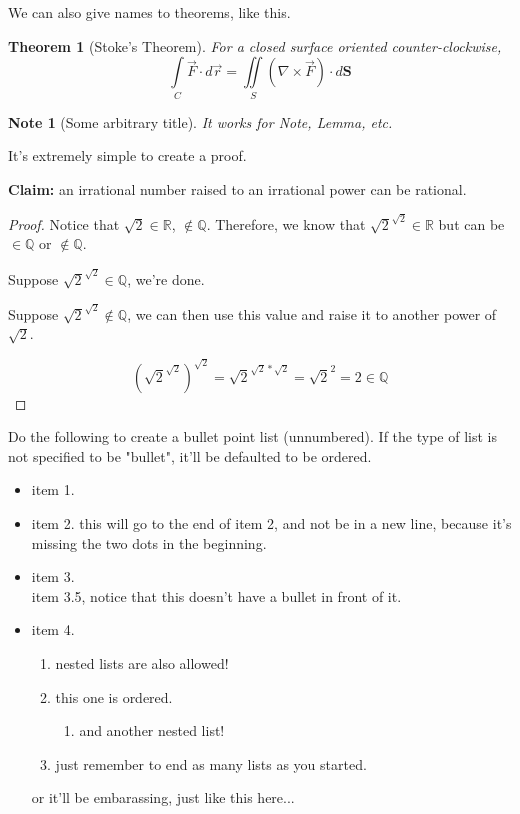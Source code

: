 \documentclass[12pt]{article}
\newtheorem*{Theorem}{Theorem}
\newtheorem{Note}[Lemma]{Note}
\begin{document}
We can also give names to theorems, like this.

\begin{Theorem}[Stoke's Theorem]
For a closed surface oriented counter-clockwise,
\[ \int\limits_C \vec{F} \cdot d\vec{r} = \iint\limits_S (\nabla \times \vec{F}) \cdot d\textbf{S} \]
\end{Theorem}

\begin{Note}[Some arbitrary title]
It works for \emph{Note}, \emph{Lemma}, etc.
\end{Note}

It's extremely simple to create a proof.

\medskip

\textbf{Claim:} an irrational number raised to an irrational power can be rational.
\begin{proof}

Notice that $\sqrt{2} \in \mathbb{R}$, $\notin \mathbb{Q}$. Therefore, we know that $\sqrt{2}^{\sqrt{2}} \in \mathbb{R}$ but can be $\in \mathbb{Q}$ or $\notin \mathbb{Q}$.

Suppose $\sqrt{2}^{\sqrt{2}} \in \mathbb{Q}$, we're done.

Suppose $\sqrt{2}^{\sqrt{2}} \notin \mathbb{Q}$, we can then use this value and raise it to another power of $\sqrt{2}$.

\[ (\sqrt{2}^{\sqrt{2}})^{\sqrt{2}} = \sqrt{2}^{\sqrt{2} * \sqrt{2}} = \sqrt{2}^2 = 2 \in \mathbb{Q} \]
\end{proof}


Do the following to create a bullet point list (unnumbered).
If the type of list is not specified to be "bullet", it'll be defaulted to be
ordered.
\begin{itemize}
    \item item 1.
    \item item 2.
    this will go to the end of item 2, and not be in a new line, because it's missing the two dots in the beginning.
    \item item 3.
    \\ item 3.5, notice that this doesn't have a bullet in front of it.
    \item item 4.
    \begin{enumerate}
        \item nested lists are also allowed!
        \item this one is ordered.
        \begin{enumerate}
            \item and another nested list!
        \end{enumerate}
        \item just remember to end as many lists as you started.
    \end{enumerate}
    
    
    or it'll be embarassing, just like this here...
    
\end{itemize}
\end{document}

